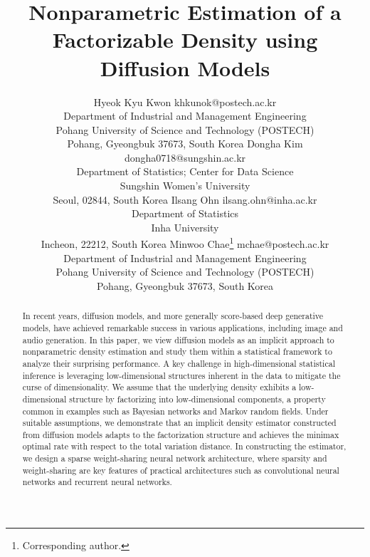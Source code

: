 \documentclass[twoside,11pt]{article}
\begin{document}
\title{Nonparametric Estimation of a Factorizable Density using Diffusion Models}

\author{\name Hyeok Kyu Kwon \email khkunok@postech.ac.kr \\
       \addr Department of Industrial and Management Engineering \\
       Pohang University of Science and Technology (POSTECH) \\
       Pohang, Gyeongbuk 37673, South Korea
       \AND
       \name Dongha Kim \email dongha0718@sungshin.ac.kr \\
       \addr Department of Statistics; Center for Data Science \\
       Sungshin Women’s University \\
       Seoul, 02844, South Korea
       \AND
       \name Ilsang Ohn \email ilsang.ohn@inha.ac.kr \\
       \addr Department of Statistics \\
       Inha University \\
       Incheon, 22212, South Korea
       \AND
       \name Minwoo Chae\thanks{Corresponding author.} \email mchae@postech.ac.kr \\
       \addr Department of Industrial and Management Engineering \\
       Pohang University of Science and Technology (POSTECH) \\
       Pohang, Gyeongbuk 37673, South Korea       
       }




\maketitle

\begin{abstract}%
In recent years, diffusion models, and more generally score-based deep generative models, have achieved remarkable success in various applications, including image and audio generation.
In this paper, we view diffusion models as an implicit approach to nonparametric density estimation and study them within a statistical framework to analyze their surprising performance.
A key challenge in high-dimensional statistical inference is leveraging low-dimensional structures inherent in the data to mitigate the curse of dimensionality.
We assume that the underlying density exhibits a low-dimensional structure by factorizing into low-dimensional components, a property common in examples such as Bayesian networks and Markov random fields.
Under suitable assumptions, we demonstrate that an implicit density estimator constructed from diffusion models adapts to the factorization structure and achieves the minimax optimal rate with respect to the total variation distance.
In constructing the estimator, we design a sparse weight-sharing neural network architecture, where sparsity and weight-sharing are key features of practical architectures such as convolutional neural networks and recurrent neural networks.
\end{abstract}
\end{document}
